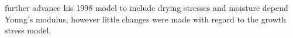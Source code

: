 \citet{Yamamoto_2002} further advance his 1998 model to
include drying stresses and moisture depend Young's modulus, however little
changes were made with regard to the growth stress model.